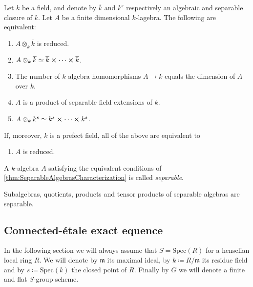 \documentclass[../Main]{subfiles}
\begin{document}
\begin{thm}
	\label{thm:SeparableAlgebrasCharacterization}
	Let $k$ be a field, and denote by $\overline{k}$ and $k^s$ respectively
	an algebraic and separable closure of $k$.
	Let $A$ be a finite dimensional $k$-lagebra.
	The following are equivalent:
\begin{enumerate}
	\item $A \otimes_k \overline{k}$ is reduced.
	\item $A \otimes_k \overline{k} \simeq \overline{k} \cross \cdots \cross \overline{k}$.
	\item The number of $k$-algebra homomorphisms $A \to  \overline{k}$
		equals the dimension of $A$ over $k$.
	\item $A$ is a product of separable field extensions of $k$.
	\item $A \otimes_k k^s \simeq k^s \cross \cdots \cross k^s$.
\end{enumerate}
If, moreover, $k$ is a prefect field, all of the above are equivalent to
\begin{enumerate}[resume]
	\item $A$ is reduced.
\end{enumerate}
\end{thm}


\begin{defn}
	A $k$-algebra $A$ satisfying the equivalent conditions of
	\cref{thm:SeparableAlgebrasCharacterization}
	is called {\em separable}.
\end{defn}


\begin{cor}
	Subalgebras, quotients, products and tensor products of separable algebras
	are separable.
\end{cor} 


\subsection{Connected-étale exact equence}
In the following section we will always assume that 
$S = \mathrm{Spec}(R)$	for a henselian local ring $R$.
We will denote by $\mathfrak{m}$ its maximal ideal, by $k \coloneqq R/\mathfrak{m}$
its residue field and by $s \coloneqq \mathrm{Spec}(k)$ the closed point of $R$.
Finally by $G$ we will denote a finite and flat $S$-group scheme.
\end{document}
